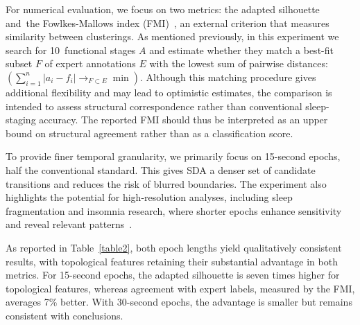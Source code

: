 \documentclass[pdflatex,sn-basic,Numbered]{sn-jnl}
\begin{document}
For numerical evaluation, we focus on two metrics: the adapted silhouette and~the Fowlkes-Mallows index (FMI)~\cite{Fowlkes01091983}, an external criterion that measures similarity between clusterings. As mentioned previously, in this experiment we search for 10~functional stages $A$ and estimate whether they match a best-fit subset $F$ of expert annotations $E$ with the lowest sum of pairwise distances: $\left( \sum_{i = 1}^{n} |a_i - f_i| \rightarrow_{F \subset E} \min \right)$. Although this matching procedure gives additional flexibility and may lead to optimistic estimates, the comparison is intended to assess structural correspondence rather than conventional sleep-staging accuracy. The reported FMI should thus be interpreted as an upper bound on structural agreement rather than as a classification score.

To provide finer temporal granularity, we primarily focus on 15-second epochs, half the conventional standard. This gives SDA a denser set of candidate transitions and reduces the risk of blurred boundaries. The experiment also highlights the potential for high-resolution analyses, including sleep fragmentation and insomnia research, where shorter epochs enhance sensitivity and reveal relevant patterns~\cite{aydn2011singular,aydn2011computer}.

As reported in Table~\ref{table2}, both epoch lengths yield qualitatively consistent results, with topological features retaining their substantial advantage in both metrics. For 15-second epochs, the adapted silhouette is seven times higher for topological features, whereas agreement with expert labels, measured by the FMI, averages 7\% better. With 30-second epochs, the advantage is smaller but remains consistent with conclusions.
\end{document}
